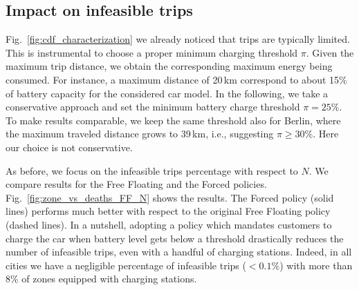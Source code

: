 \subsection{Impact on infeasible trips}

Fig.~\ref{fig:cdf_characterization} we already noticed that trips are typically limited. This is instrumental to choose a proper minimum charging threshold $\pi$. Given the maximum trip distance, we obtain the corresponding maximum energy being consumed. For instance, a maximum distance of 20\,km correspond to about 15\% of battery capacity for the considered car model. In the following, we take a conservative approach and set the minimum battery charge threshold $\pi=25\%$. To make results comparable, we keep the same threshold also for Berlin, where the maximum traveled distance grows to 39\,km, i.e., suggesting $\pi\geq 30\%$. Here our choice is not conservative.

As before, we focus on the infeasible trips percentage with respect to $N$. We compare results for the Free Floating and the Forced policies. 
Fig.~\ref{fig:zone_vs_deaths_FF_N} shows the results. The Forced policy (solid lines) performs much better with respect to the original Free Floating policy (dashed lines). In a nutshell, adopting a policy which mandates customers to charge the car when battery level gets below a threshold drastically reduces the number of infeasible trips, even with a handful of  charging stations. Indeed, in all cities we have a negligible percentage of infeasible trips ($< 0.1 \%$) with more than 8\% of zones equipped with charging stations.

